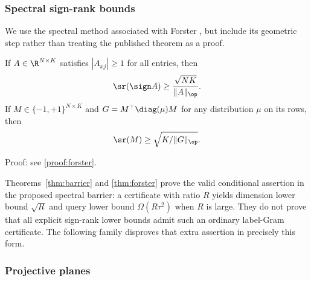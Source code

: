 \subsubsection{Spectral sign-rank bounds}
We use the spectral method associated with Forster \citep{Forster02}, but include its geometric step rather than treating the published theorem as a proof.


\begin{theorem}\label{thm:forster}
If $A\in\R^{N\times K}$ satisfies $|A_{xj}|\geq1$ for all entries, then
\begin{equation}\label{eq:forster}
 \sr(\sign A)\geq\frac{\sqrt{NK}}{\|A\|_\op}.
\end{equation}
If $M\in\{-1,+1\}^{N\times K}$ and $G=M^\top\diag(\mu)M$ for any distribution $\mu$ on its rows, then
\begin{equation}\label{eq:weighted}
 \sr(M)\geq\sqrt{K/\|G\|_\op}.
\end{equation}
\end{theorem}

\noindent Proof: see \cref{proof:forster}.\par


Theorems~\ref{thm:barrier} and \ref{thm:forster} prove the valid conditional assertion in the proposed spectral barrier: a certificate with ratio $R$ yields dimension lower bound $\sqrt R$ and query lower bound $\Omega(R\tau^2)$ when $R$ is large. They do not prove that all explicit sign-rank lower bounds admit such an ordinary label-Gram certificate. The following family disproves that extra assertion in precisely this form.

\subsubsection{Projective planes}

